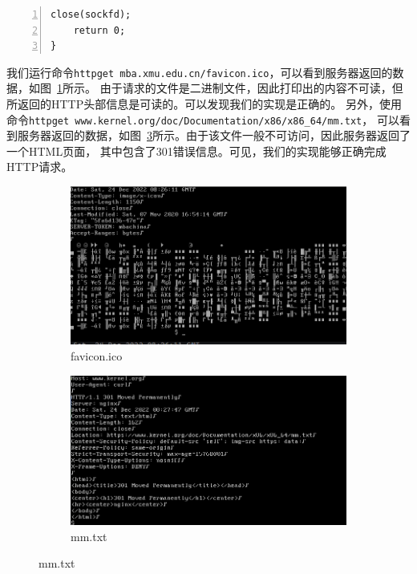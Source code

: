 \documentclass[a4paper,twoside]{ctexrep}
\begin{document}
\begin{spacing}{1.2}
\begin{lstlisting}[numbers=left,style=CppStyle,caption={httpget实现},label={code:httpget}]
	close(sockfd);
	return 0;
}
\end{lstlisting}

我们运行命令\texttt{httpget mba.xmu.edu.cn/favicon.ico}，可以看到服务器返回的数据，如图~\ref{fig:favicon}所示。
由于请求的文件是二进制文件，因此打印出的内容不可读，但所返回的HTTP头部信息是可读的。可以发现我们的实现是正确的。
另外，使用命令\texttt{httpget www.kernel.org/doc/Documentation/x86/x86\_64/mm.txt}，
可以看到服务器返回的数据，如图~\ref{fig:mmtxt}所示。由于该文件一般不可访问，因此服务器返回了一个HTML页面，
其中包含了301错误信息。可见，我们的实现能够正确完成HTTP请求。
\begin{figure}[htb]
	\centering
	\caption{httpget命令}
	\label{fig:httpget}
	\begin{subfigure}{0.4\textwidth}
		\centering
		\includegraphics[width=\textwidth]{httpget1.png}
		\caption{favicon.ico}
		\label{fig:favicon}
	\end{subfigure}
	\begin{subfigure}{0.4\textwidth}
		\centering
		\includegraphics[width=\textwidth]{httpget2.png}
		\caption{mm.txt}
		\label{fig:mmtxt}
	\end{subfigure}
\end{figure}


\end{spacing}
\end{document}
